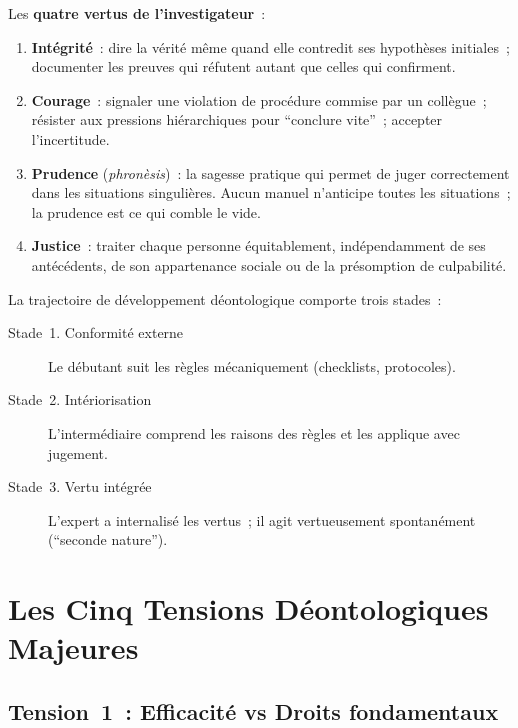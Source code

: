 Les \textbf{quatre vertus de l'investigateur}~:
\begin{enumerate}
    \item \textbf{Intégrité}~: dire la vérité même quand elle contredit
          ses hypothèses initiales~; documenter les preuves qui réfutent
          autant que celles qui confirment.
    \item \textbf{Courage}~: signaler une violation de procédure commise
          par un collègue~; résister aux pressions hiérarchiques pour
          ``conclure vite''~; accepter l'incertitude.
    \item \textbf{Prudence} (\textit{phronèsis})~: la sagesse pratique
          qui permet de juger correctement dans les situations singulières.
          Aucun manuel n'anticipe toutes les situations~; la prudence
          est ce qui comble le vide.
    \item \textbf{Justice}~: traiter chaque personne équitablement,
          indépendamment de ses antécédents, de son appartenance sociale
          ou de la présomption de culpabilité.
\end{enumerate}

La trajectoire de développement déontologique comporte trois stades~:
\begin{description}
    \item[Stade~1. Conformité externe] Le débutant suit les règles
          mécaniquement (checklists, protocoles).
    \item[Stade~2. Intériorisation] L'intermédiaire comprend les
          raisons des règles et les applique avec jugement.
    \item[Stade~3. Vertu intégrée] L'expert a internalisé les vertus~;
          il agit vertueusement spontanément (``seconde nature'').
\end{description}

\section{Les Cinq Tensions Déontologiques Majeures}
\label{sec:tensions}

\subsection{Tension~1~: Efficacité vs Droits fondamentaux}


